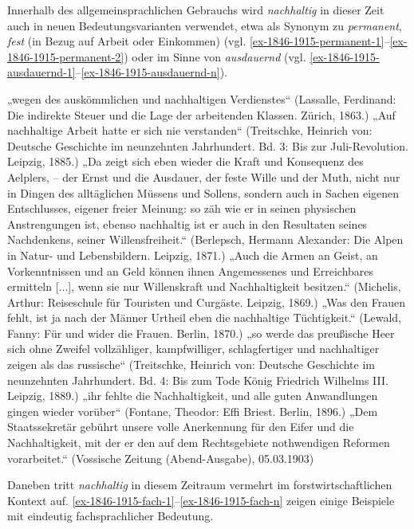 \documentclass[
    german,
    a4paper,%
    12pt,%
    oneside,%
    toc=bibliography,
    final,
]{scrartcl}
\begin{document}
Innerhalb des allgemeinsprachlichen Gebrauchs wird \textit{nachhaltig} in dieser Zeit auch in neuen Bedeutungsvarianten verwendet, etwa als Synonym zu \textit{permanent}, \textit{fest} (in Bezug auf Arbeit oder Einkommen) (vgl. \ref{ex-1846-1915-permanent-1}–\ref{ex-1846-1915-permanent-2}) oder im Sinne von \textit{ausdauernd} (vgl. \ref{ex-1846-1915-ausdauernd-1}–\ref{ex-1846-1915-ausdauernd-n}).

\begin{exe}
\ex \label{ex-1846-1915-permanent-1} „wegen des auskömmlichen und nachhaltigen Verdienstes“ (Lassalle, Ferdinand: Die indirekte Steuer und die Lage der arbeitenden Klassen. Zürich, 1863.)
\ex \label{ex-1846-1915-permanent-2} „Auf nachhaltige Arbeit hatte er sich nie verstanden“ (Treitschke, Heinrich von: Deutsche Geschichte im neunzehnten Jahrhundert. Bd. 3: Bis zur Juli-Revolution. Leipzig, 1885.)
\ex \label{ex-1846-1915-ausdauernd-1} „Da zeigt sich eben wieder die Kraft und Konsequenz des Aelplers, -- der Ernst und die Ausdauer, der feste Wille und der Muth, nicht nur in Dingen des alltäglichen Müssens und Sollens, sondern auch in Sachen eigenen Entschlusses, eigener freier Meinung: so zäh wie er in seinen physischen Anstrengungen ist, ebenso nachhaltig ist er auch in den Resultaten seines Nachdenkens, seiner Willensfreiheit.“ (Berlepsch, Hermann Alexander: Die Alpen in Natur- und Lebensbildern. Leipzig, 1871.)
\ex „Auch die Armen an Geist, an Vorkenntnissen und an Geld können ihnen Angemessenes und Erreichbares ermitteln [...], wenn sie nur Willenskraft und Nachhaltigkeit besitzen.“ (Michelis, Arthur: Reiseschule für Touristen und Curgäste. Leipzig, 1869.)
\ex „Was den Frauen fehlt, ist ja nach der Männer Urtheil eben die nachhaltige Tüchtigkeit.“ (Lewald, Fanny: Für und wider die Frauen. Berlin, 1870.)
\ex „so werde das preußische Heer sich ohne Zweifel vollzähliger, kampfwilliger, schlagfertiger und nachhaltiger zeigen als das russische“ (Treitschke, Heinrich von: Deutsche Geschichte im neunzehnten Jahrhundert. Bd. 4: Bis zum Tode König Friedrich Wilhelms III. Leipzig, 1889.)
\ex „ihr fehlte die Nachhaltigkeit, und alle guten Anwandlungen gingen wieder vorüber“ (Fontane, Theodor: Effi Briest. Berlin, 1896.)
\ex \label{ex-1846-1915-ausdauernd-n} „Dem Staatssekretär gebührt unsere volle Anerkennung für den Eifer und die Nachhaltigkeit, mit der er den auf dem Rechtsgebiete nothwendigen Reformen vorarbeitet.“ (Vossische Zeitung (Abend-Ausgabe), 05.03.1903)
\end{exe}

Daneben tritt \textit{nachhaltig} in diesem Zeitraum vermehrt im forstwirtschaftlichen Kontext auf. \ref{ex-1846-1915-fach-1}–\ref{ex-1846-1915-fach-n} zeigen einige Beispiele mit eindeutig fachsprachlicher Bedeutung.
\end{document}
